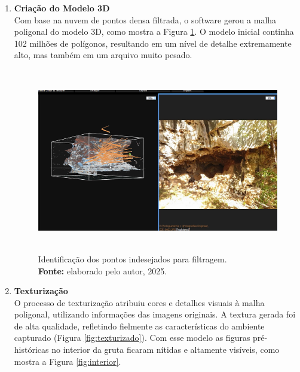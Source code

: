 \begin{enumerate}
\item \textbf{Criação do Modelo 3D} \\
Com base na nuvem de pontos densa filtrada, o software gerou a malha poligonal do modelo 3D, como mostra a Figura \ref{fig:modelo 3D solido}. O modelo inicial continha 102 milhões de polígonos, resultando em um nível de detalhe extremamente alto, mas também em um arquivo muito pesado.
\begin{figure}[H]
        \centering
        \includegraphics[height=8cm, keepaspectratio]{img/reality e fotogrametria processo/modelo solido e foto.png}
        \caption{Identificação dos pontos indesejados para filtragem. \\
            \textbf{Fonte:} elaborado pelo autor, 2025.}
        \label{fig:modelo 3D solido}
\end{figure}

\item \textbf{Texturização} \\
O processo de texturização atribuiu cores e detalhes visuais à malha poligonal, utilizando informações das imagens originais. A textura gerada foi de alta qualidade, refletindo fielmente as características do ambiente capturado (Figura \ref{fig:texturizado}). Com esse modelo as figuras pré-históricas no interior da gruta ficaram nítidas e altamente visíveis, como mostra a Figura \ref{fig:interior}.


\end{enumerate}
